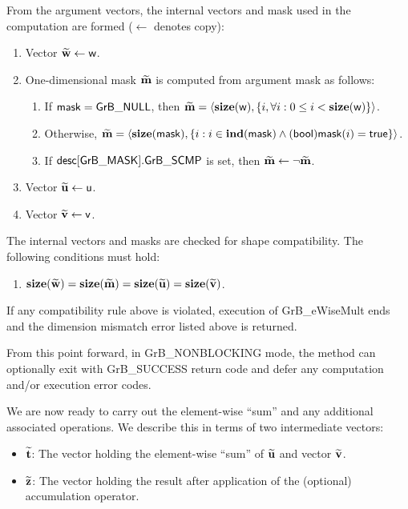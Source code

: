 From the argument vectors, the internal vectors and mask used in 
the computation are formed ($\leftarrow$ denotes copy):
\begin{enumerate}
	\item Vector ${\bf \widetilde{w}} \leftarrow {\sf w}$.

	\item One-dimensional mask ${\bf \widetilde{m}}$ is computed from 
    argument {\sf mask} as follows:
	\begin{enumerate}
		\item	If ${\sf mask} = {\sf GrB\_NULL}$, then ${\bf \widetilde{m}} = 
        \langle \bold{size}({\sf w}), \{i, \forall i : 0 \leq i < 
        \bold{size}({\sf w}) \} \rangle$.

		\item	Otherwise, ${\bf \widetilde{m}} = 
        \langle \bold{size}({\sf mask}), \{i :  i \in \bold{ind}({\sf mask}) \wedge
        ({\sf bool}){\sf mask}(i) = {\sf true} \} \rangle$.

		\item	If ${\sf desc[GrB\_MASK].GrB\_SCMP}$ is set, then ${\bf \widetilde{m}} \leftarrow \neg {\bf \widetilde{m}}$.
	\end{enumerate}

	\item Vector ${\bf \widetilde{u}} \leftarrow {\sf u}$.

	\item Vector ${\bf \widetilde{v}} \leftarrow {\sf v}$.
\end{enumerate}

The internal vectors and masks are checked for shape compatibility. The following 
conditions must hold:
\begin{enumerate}
	\item $\bold{size}({\bf \widetilde{w}}) = \bold{size}({\bf \widetilde{m}})
    = \bold{size}({\bf \widetilde{u}}) = \bold{size}({\bf \widetilde{v}})$.
\end{enumerate}
If any compatibility rule above is violated, execution of {\sf GrB\_eWiseMult} ends and 
the dimension mismatch error listed above is returned.

From this point forward, in {\sf GrB\_NONBLOCKING} mode, the method can 
optionally exit with {\sf GrB\_SUCCESS} return code and defer any computation 
and/or execution error codes.

We are now ready to carry out the element-wise ``sum'' and any additional 
associated operations.  We describe this in terms of two intermediate vectors:
\begin{itemize}
	\item ${\bf \widetilde{t}}$: The vector holding the element-wise ``sum'' of
    ${\bf \widetilde{u}}$ and vector ${\bf \widetilde{v}}$.
	\item ${\bf \widetilde{z}}$: The vector holding the result after 
    application of the (optional) accumulation operator.
\end{itemize}


